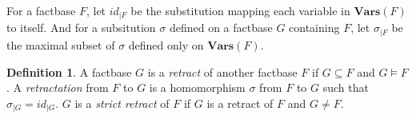 \documentclass{article}
\theoremstyle{definition}
\newtheorem{definition}{Definition}[section]
\theoremstyle{remark}
\newcommand{\Vars}{\textbf{Vars}}
\newcommand{\Terms}{\textbf{Terms}}
\begin{document}





For a factbase $F$, let $id_{|F}$ be the substitution mapping each variable in $\Vars(F)$ to itself. And for a subsitution $\sigma$ defined on a factbase $G$ containing $F$, let $\sigma_{|F}$ be the maximal subset of $\sigma$ defined only on $\Vars(F)$. 

\begin{definition}
A factbase $G$ is a \emph{retract} of another factbase $F$ if $G \subseteq F$ and $G \vDash F$. A \emph{retractation} from $F$ to $G$ is a homomorphism $\sigma$ from $F$ to $G$ such that $\sigma_{|G}=id_{|G}$. $G$ is a \emph{strict retract} of $F$ if $G$ is a retract of $F$ and $G \neq F$.
\end{definition}
\end{document}
